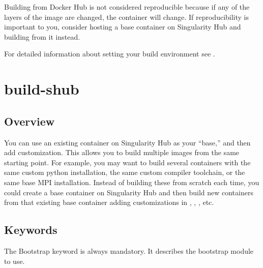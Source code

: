 \documentclass[letterpaper,10pt,english]{sphinxmanual}
\begin{document}
Building from Docker Hub is not considered reproducible because if any of the layers of the image are changed, the container will change.
If reproducibility is important to you, consider hosting a base container on Singularity Hub and building from it instead.

For detailed information about setting your build environment see .


\section{build-shub}
\label{\detokenize{appendix:build-shub}}

\subsection{Overview}
\label{\detokenize{appendix:sec-build-shub}}\label{\detokenize{appendix:id2}}
You can use an existing container on Singularity Hub as your “base,” and then add customization. This allows you to build multiple images
from the same starting point. For example, you may want to build several containers with the same custom python installation, the same custom
compiler toolchain, or the same base MPI installation. Instead of building these from scratch each time, you could create a base container on
Singularity Hub and then build new containers from that existing base container adding customizations in  , , , etc.


\subsection{Keywords}
\label{\detokenize{appendix:id3}}
%
\begin{sphinxVerbatim}[commandchars=\\\{\}]
 
\end{sphinxVerbatim}

The Bootstrap keyword is always mandatory. It describes the bootstrap module to use.

%
\begin{sphinxVerbatim}[commandchars=\\\{\}]
 
\end{sphinxVerbatim}
\end{document}
